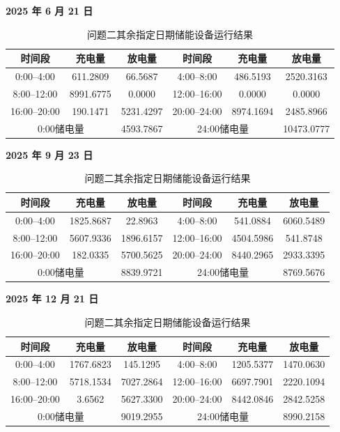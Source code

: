 \documentclass[12pt,a4paper]{ctexart}
\renewcommand{\textbf}[1]{{\CJKfamily{heiti}\bfseries #1}}
\begin{document}
\begin{table}[H]
\centering
\caption{问题二其余指定日期储能设备运行结果}
\label{tab:q2-storage-appendix}
\small
\textbf{2025 年 6 月 21 日}\par
\begin{tabular}{|c|c|c|c|c|c|}
\hline
时间段 & 充电量 & 放电量 & 时间段 & 充电量 & 放电量\\
\hline
0:00--4:00 & 611.2809 & 66.5687 & 4:00--8:00 & 486.5193 & 2520.3163\\
\hline
8:00--12:00 & 8991.6775 & 0.0000 & 12:00--16:00 & 0.0000 & 0.0000\\
\hline
16:00--20:00 & 190.1471 & 5231.4297 & 20:00--24:00 & 8974.1694 & 2485.8966\\
\hline
\multicolumn{2}{|c|}{0:00储电量} & 4593.7867 & \multicolumn{2}{c|}{24:00储电量} & 10473.0777\\
\hline
\end{tabular}\par\vspace{0.7em}

\textbf{2025 年 9 月 23 日}\par
\begin{tabular}{|c|c|c|c|c|c|}
\hline
时间段 & 充电量 & 放电量 & 时间段 & 充电量 & 放电量\\
\hline
0:00--4:00 & 1825.8687 & 22.8963 & 4:00--8:00 & 541.0884 & 6060.5489\\
\hline
8:00--12:00 & 5607.9336 & 1896.6157 & 12:00--16:00 & 4504.5986 & 541.8748\\
\hline
16:00--20:00 & 182.0335 & 5700.5625 & 20:00--24:00 & 8440.2965 & 2933.3395\\
\hline
\multicolumn{2}{|c|}{0:00储电量} & 8839.9721 & \multicolumn{2}{c|}{24:00储电量} & 8769.5676\\
\hline
\end{tabular}\par\vspace{0.7em}

\textbf{2025 年 12 月 21 日}\par
\begin{tabular}{|c|c|c|c|c|c|}
\hline
时间段 & 充电量 & 放电量 & 时间段 & 充电量 & 放电量\\
\hline
0:00--4:00 & 1767.6823 & 145.1295 & 4:00--8:00 & 1205.5377 & 1470.0630\\
\hline
8:00--12:00 & 5718.1534 & 7027.2864 & 12:00--16:00 & 6697.7901 & 2220.1094\\
\hline
16:00--20:00 & 3.6562 & 5627.3300 & 20:00--24:00 & 8442.0846 & 2842.5258\\
\hline
\multicolumn{2}{|c|}{0:00储电量} & 9019.2955 & \multicolumn{2}{c|}{24:00储电量} & 8990.2158\\
\hline
\end{tabular}
\end{table}
\end{document}
